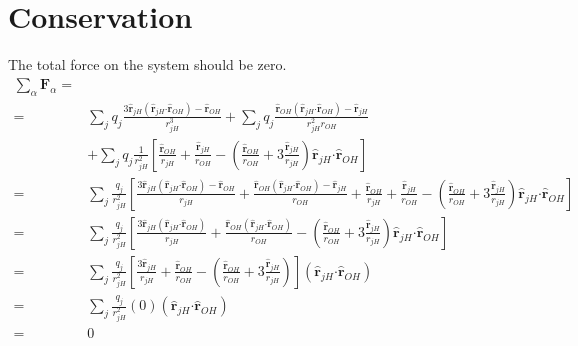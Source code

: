 \documentclass{article}
\newcommand{\vect}[1]{\boldsymbol{\mathbf{#1}}}
\begin{document}
\section{Conservation}
The total force on the system should be zero.
\begin{align*}
\sum_\alpha \vect F_\alpha =& \\
=& \sum_j q_j \frac{ 3\vect{\hat r}_{j H}(\vect{\hat r}_{j H}\vect\cdot\vect{\hat r}_{OH}) - \vect{\hat r}_{OH}}{r_{j H}^3} + \sum_j q_j \frac{ \vect{\hat r}_{OH}(\vect{\hat r}_{jH}\vect\cdot\vect{\hat r}_{OH}) - \vect{\hat r}_{jH}}{r_{jH}^2r_{OH}} \\
&+ \sum_j q_j \frac{1}{r_{jH}^2} \left[\frac{\vect{\hat r}_{OH}}{r_{jH}} + \frac{\vect{\hat r}_{jH}}{r_{OH}} - \left(\frac{\vect{\hat r}_{OH}}{r_{OH}} +3\frac{\vect{\hat r}_{jH}}{r_{jH}}\right) \vect{\hat r}_{jH}\vect\cdot\vect{\hat r}_{OH} \right] \\
=& \sum_j \frac{q_j}{r_{jH}^2} \left[ \frac{ 3\vect{\hat r}_{j H}(\vect{\hat r}_{j H}\vect\cdot\vect{\hat r}_{OH}) - \vect{\hat r}_{OH}}{r_{j H}} + \frac{ \vect{\hat r}_{OH}(\vect{\hat r}_{jH}\vect\cdot\vect{\hat r}_{OH}) - \vect{\hat r}_{jH}}{r_{OH}} + \frac{\vect{\hat r}_{OH}}{r_{jH}} + \frac{\vect{\hat r}_{jH}}{r_{OH}} - \left(\frac{\vect{\hat r}_{OH}}{r_{OH}} +3\frac{\vect{\hat r}_{jH}}{r_{jH}}\right) \vect{\hat r}_{jH}\vect\cdot\vect{\hat r}_{OH} \right] \\
=& \sum_j \frac{q_j}{r_{jH}^2} \left[ \frac{ 3\vect{\hat r}_{j H}(\vect{\hat r}_{j H}\vect\cdot\vect{\hat r}_{OH})}{r_{j H}} + \frac{ \vect{\hat r}_{OH}(\vect{\hat r}_{jH}\vect\cdot\vect{\hat r}_{OH})}{r_{OH}} - \left(\frac{\vect{\hat r}_{OH}}{r_{OH}} +3\frac{\vect{\hat r}_{jH}}{r_{jH}}\right) \vect{\hat r}_{jH}\vect\cdot\vect{\hat r}_{OH} \right] \\
=& \sum_j \frac{q_j}{r_{jH}^2} \left[ \frac{ 3\vect{\hat r}_{j H}}{r_{j H}} + \frac{ \vect{\hat r}_{OH}}{r_{OH}} - \left(\frac{\vect{\hat r}_{OH}}{r_{OH}} +3\frac{\vect{\hat r}_{jH}}{r_{jH}}\right)  \right](\vect{\hat r}_{j H}\vect\cdot\vect{\hat r}_{OH}) \\
=& \sum_j \frac{q_j}{r_{jH}^2} \left(0 \right)(\vect{\hat r}_{j H}\vect\cdot\vect{\hat r}_{OH}) \\
=& 0
\end{align*}
\end{document}

